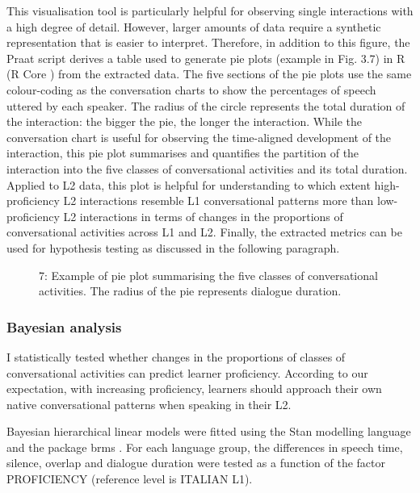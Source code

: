 This visualisation tool is particularly helpful for observing single interactions with a high degree of detail. However, larger amounts of data require a synthetic representation that is easier to interpret. Therefore, in addition to this figure, the Praat script derives a table used to generate pie plots (example in Fig. 3.7) in R (R Core \citealt{Team2013}) from the extracted data. The five sections of the pie plots use the same colour-coding as the conversation charts to show the percentages of speech uttered by each speaker. The radius of the circle represents the total duration of the interaction: the bigger the pie, the longer the interaction. While the conversation chart is useful for observing the time-aligned development of the interaction, this pie plot summarises and quantifies the partition of the interaction into the five classes of conversational activities and its total duration. Applied to L2 data, this plot is helpful for understanding to which extent high-proficiency L2 interactions resemble L1 conversational patterns more than low-proficiency L2 interactions in terms of changes in the proportions of conversational activities across L1 and L2. Finally, the extracted metrics can be used for hypothesis testing as discussed in the following paragraph.

  
 

\begin{stylecaption}\begin{figure}
\caption{7: Example of pie plot summarising the five classes of conversational activities. The radius of the pie represents dialogue duration.}
\label{fig:key:3}
\end{figure}\end{stylecaption}

\subsubsection{Bayesian analysis}
\hypertarget{Toc191305934}{}
I statistically tested whether changes in the proportions of classes of conversational activities can predict learner proficiency. According to our expectation, with increasing proficiency, learners should approach their own native conversational patterns when speaking in their L2.

Bayesian hierarchical linear models were fitted using the Stan modelling language \citep{CarpenterEtAl2017} and the package brms \citep{Bürkner2016}. For each language group, the differences in speech time, silence, overlap and dialogue duration were tested as a function of the factor PROFICIENCY (reference level is ITALIAN L1).


